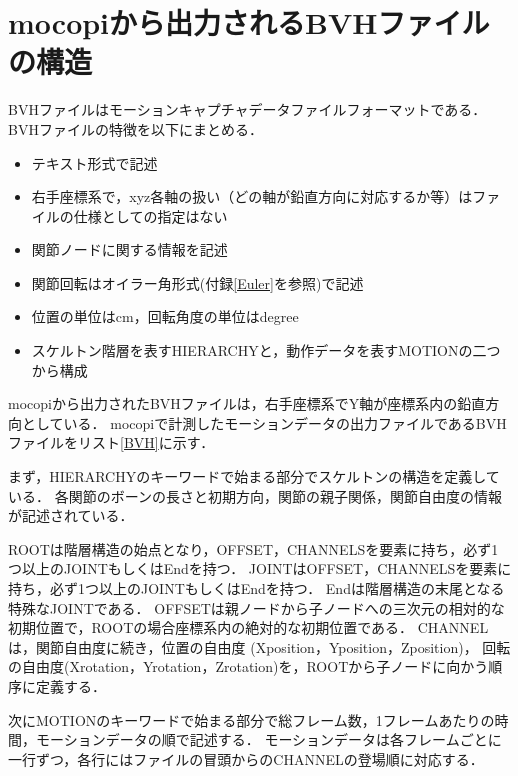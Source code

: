 \documentclass[a4j, fleqn, 12pt]{jsreport}
\begin{document}
\chapter{mocopiから出力されるBVHファイルの構造}\label{BVH_file}
BVHファイルはモーションキャプチャデータファイルフォーマットである．
BVHファイルの特徴を以下にまとめる\cite{BVH}．
\begin{itemize}
  \item テキスト形式で記述
  \item 右手座標系で，xyz各軸の扱い（どの軸が鉛直方向に対応するか等）はファイルの仕様としての指定はない
  \item 関節ノードに関する情報を記述
  \item 関節回転はオイラー角形式(付録\ref{Euler}を参照)で記述
  \item 位置の単位はcm，回転角度の単位はdegree
  \item スケルトン階層を表すHIERARCHYと，動作データを表すMOTIONの二つから構成
\end{itemize}
mocopiから出力されたBVHファイルは，右手座標系でY軸が座標系内の鉛直方向としている．
mocopiで計測したモーションデータの出力ファイルであるBVHファイルをリスト\ref{BVH}に示す．

まず，HIERARCHYのキーワードで始まる部分でスケルトンの構造を定義している．
各関節のボーンの長さと初期方向，関節の親子関係，関節自由度の情報が記述されている．

ROOTは階層構造の始点となり，OFFSET，CHANNELSを要素に持ち，必ず1つ以上のJOINTもしくはEndを持つ．
JOINTはOFFSET，CHANNELSを要素に持ち，必ず1つ以上のJOINTもしくはEndを持つ．
Endは階層構造の末尾となる特殊なJOINTである．
OFFSETは親ノードから子ノードへの三次元の相対的な初期位置で，ROOTの場合座標系内の絶対的な初期位置である．
CHANNELは，関節自由度に続き，位置の自由度 (Xposition，Yposition，Zposition)，
回転の自由度(Xrotation，Yrotation，Zrotation)を，ROOTから子ノードに向かう順序に定義する．

次にMOTIONのキーワードで始まる部分で総フレーム数，1フレームあたりの時間，モーションデータの順で記述する．
モーションデータは各フレームごとに一行ずつ，各行にはファイルの冒頭からのCHANNELの登場順に対応する．
\end{document}

